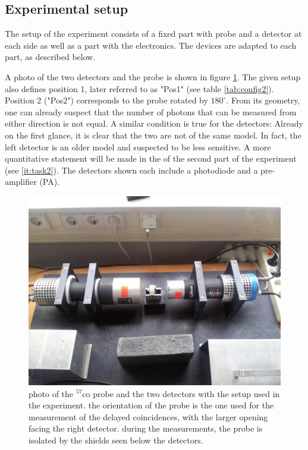 \subsection{Experimental setup}
The setup of the experiment consists of a fixed part with probe and a detector at each side 
as well as a part with the electronics. The devices are adapted to each part, as described below. 

A photo of the two detectors and the probe is shown in figure \ref{fig:position_1}. The given setup also 
defines position 1, later referred to as "Pos1" (see table \ref{tab:config2}). Position 2 ("Pos2") corresponds 
to the probe rotated by $180^\circ$. From its geometry, one can already suspect that the number of photons 
that can be measured from either direction is not equal. A similar condition is true for the detectors:
Already on the first glance, it is clear that the two are not of the same model. In fact, the left detector 
is an older model and suspected to be less sensitive. A more quantitative statement will be made in the 
of the second part of the experiment (see \ref{it:task2}). The detectors shown each include a photodiode 
and a pre-amplifier (PA). 

\begin{figure}[h]
    \centering
    \includegraphics[width=0.8\linewidth]{figures/position_1.jpg}
    \caption{
        photo of the $^{57}$co probe and the two detectors with the setup used in the 
        experiment. the orientation of the probe is the one used for the measurement of 
        the delayed coincidences, with the larger opening facing the right detector. 
        during the measurements, the probe is isolated by the shields seen below the detectors.
        }
    \label{fig:position_1}
\end{figure}

